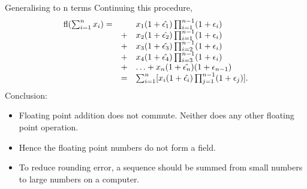 \documentclass{beamer}
\begin{document}
\begin{frame}{Generalising to n terms}
Continuing this procedure,
\begin{equation*}
\begin{array}{rll}
\text{fl}(\sum_{i=1}^n x_i) =& &x_1 (1 + \hat{\epsilon_1}) \prod_{i=1}^{n-1} (1 + \epsilon_i) \\
& + &x_2 (1 + \hat{\epsilon_2}) \prod_{i=1}^{n-1} (1 + \epsilon_i) \\
& + &x_3 (1 + \hat{\epsilon_3}) \prod_{i=2}^{n-1} (1 + \epsilon_i) \\
& + &x_4 (1 + \hat{\epsilon_4}) \prod_{i=3}^{n-1} (1 + \epsilon_i) \\
& + &\ldots + x_n (1 + \hat{\epsilon_n}) (1 + \epsilon_{n-1}) \\
&=& \sum_{i=1}^n [x_i (1 + \hat{\epsilon_i}) \prod_{j=1}^{n-1} (1 + \epsilon_j)].
\end{array}
\end{equation*}
Conclusion: 
\begin{itemize}
\item Floating point addition does not commute. Neither does any other floating point
			operation.
\item Hence the floating point numbers do not form a field.
\item To reduce rounding error, a sequence should be summed from small numbers to large numbers on a
computer.
\end{itemize}
\end{frame}
\end{document}
